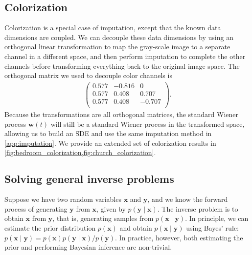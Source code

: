 \documentclass{article} \usepackage{iclr2021_conference,times}
\newcommand{\bfx}{\mathbf{x}}
\newcommand{\bfw}{\mathbf{w}}
\newcommand{\bfy}{\mathbf{y}}
\begin{document}
\subsection{Colorization}\label{app:colorization}
Colorization is a special case of imputation, except that the known data dimensions are coupled. We can decouple these data dimensions by using an orthogonal linear transformation to map the gray-scale image to a separate channel in a different space, and then perform imputation to complete the other channels before transforming everything back to the original image space. The orthogonal matrix we used to decouple color channels is
\begin{align*}
    \begin{pmatrix}
        0.577 &  -0.816 &  0\\
        0.577 &  0.408 &  0.707\\
        0.577 &  0.408 & -0.707\\
    \end{pmatrix}.
\end{align*}
Because the transformations are all orthogonal matrices, the standard Wiener process $\bfw(t)$ will still be a standard Wiener process in the transformed space, allowing us to build an SDE and use the same imputation method in \cref{app:imputation}. We provide an extended set of colorization results in \cref{fig:bedroom_colorization,fig:church_colorization}.

\subsection{Solving general inverse problems}\label{app:inverse_prob}
Suppose we have two random variables $\bfx$ and $\bfy$, and we know the forward process of generating $\bfy$ from $\bfx$, given by $p(\bfy \mid \bfx)$. The inverse problem is to obtain $\bfx$ from $\bfy$, that is, generating samples from $p(\bfx \mid \bfy)$. In principle, we can estimate the prior distribution $p(\bfx)$ and obtain $p(\bfx \mid \bfy)$ using Bayes' rule: $p(\bfx \mid \bfy) = p(\bfx) p(\bfy \mid \bfx) / p(\bfy)$. In practice, however, both estimating the prior and performing Bayesian inference are non-trivial.
\end{document}
